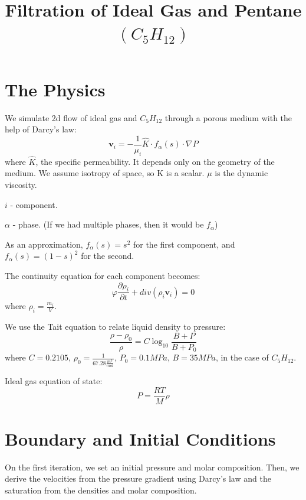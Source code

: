 \documentclass[a4paper,12pt]{article}
\author{}
\date{}
\title{Filtration of Ideal Gas and Pentane \(\left( C_5 H_{12} \right) \)}
\begin{document}
\maketitle
\section{The Physics}
We simulate 2d flow of ideal gas and \(C_5H_{12}\) through a
porous medium with the help of Darcy's law:
\begin{equation}
    \bm{v}_i = -\frac{1}{\mu_i} \hat K \cdot f_\alpha (s)
    \cdot \nabla P
\end{equation}
where \(\hat K\), the specific permeability.
It depends only on the geometry of the medium.
We assume isotropy of space, so K is a scalar.
\(\mu\) is the dynamic viscosity.

\(i\) - component.

\(\alpha\) - phase. (If we had multiple phases, then
it would be \(f_\alpha\))

As an approximation, \(f_\alpha (s) = s^2\) for the first 
component, and \(f_\alpha (s) = (1 - s)^2\) for the second.

The continuity equation for each component becomes:
\begin{equation}
    \varphi \frac{\partial \rho_i}{\partial t}
    + div (\rho_i \bm{v}_i) = 0
\end{equation}
where \(\rho_i = \frac{m_i}{V}\).

We use the Tait equation to relate liquid density to pressure:
\begin{equation}
    \frac{\rho - \rho_0}{\rho} = C \log_{10}
    \frac{B + P}{B + P_0}
\end{equation}
where \(C = 0.2105\),
\(\rho_0 = \frac{1}{67.28 \frac{m^3}{mol}}\),
\(P_0 = 0.1 MPa\), \(B = 35MPa\),
in the case of \(C_5H_{12}\).

Ideal gas equation of state:
\begin{equation}
    P = \frac{RT}{M}\rho
\end{equation}

\section{Boundary and Initial Conditions}

On the first iteration, we set an initial
pressure and molar composition.
Then, we derive the velocities from the 
pressure gradient using Darcy's law and the
saturation from the densities
and molar composition.
\end{document}
